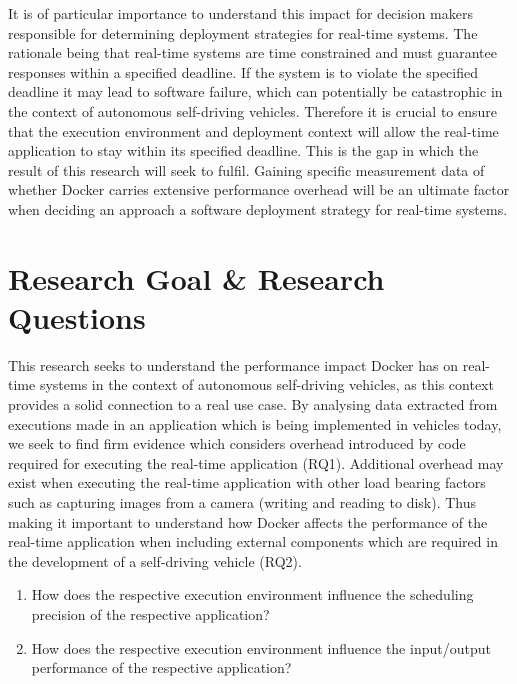 It is of particular importance to understand this impact for decision makers responsible for determining deployment strategies for real-time systems. The rationale being that real-time systems are time constrained and must guarantee responses within a specified deadline. If the system is to violate the specified deadline it may lead to software failure, which can potentially be catastrophic in the context of autonomous self-driving vehicles. Therefore it is crucial to ensure that the execution environment and deployment context will allow the real-time application to stay within its specified deadline. This is the gap in which the result of this research will seek to fulfil. Gaining specific measurement data of whether Docker carries extensive performance overhead will be an ultimate factor when deciding an approach a software deployment strategy for real-time systems.\\

\section{Research Goal \& Research Questions}
This research seeks to understand the performance impact Docker has on real-time systems in the context of autonomous self-driving vehicles, as this context provides a solid connection to a real use case. By analysing data extracted from executions made in an application which is being implemented in vehicles today, we seek to find firm evidence which considers overhead introduced by code required for executing the real-time application (RQ1). Additional overhead may exist when executing the real-time application with other load bearing factors such as capturing images from a camera (writing and reading to disk). Thus making it important to understand how Docker affects the performance of the real-time application when including external components which are required in the development of a self-driving vehicle (RQ2).\\

\begin{enumerate}[label=\textbf{RQ\arabic*}]
	\item How does the respective execution environment influence the scheduling precision of the respective application?
	\item How does the respective execution environment influence the input/output performance of the respective application?\\
\end{enumerate}



